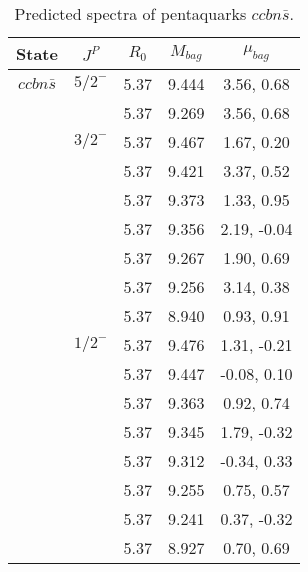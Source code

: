 \documentclass[prd,twocolumn,floatfix,nofootinbib]{revtex4}
\begin{document}
\renewcommand{\tabcolsep}{0.5cm}
\renewcommand{\arraystretch}{1.2}
\begin{table*}[!htbp]
    \caption{Predicted spectra of pentaquarks $ccbn\bar{s}$.}
    \begin{tabular}{ccccc}
        \hline\hline
        {\rm State} &$J^{P}$ &$R_{0}$ &$M_{bag}$ &$\mu_{bag}$ \\ \hline
        ${ccbn\bar{s}}$
            &${5/2}^{-}$    &5.37   &9.444  &3.56, 0.68 \\
            &               &5.37   &9.269  &3.56, 0.68 \\
            &${3/2}^{-}$    &5.37   &9.467  &1.67, 0.20 \\
            &               &5.37   &9.421  &3.37, 0.52 \\
            &               &5.37   &9.373  &1.33, 0.95 \\
            &               &5.37   &9.356  &2.19, -0.04 \\
            &               &5.37   &9.267  &1.90, 0.69 \\
            &               &5.37   &9.256  &3.14, 0.38 \\
            &               &5.37   &8.940  &0.93, 0.91 \\
            &${1/2}^{-}$    &5.37   &9.476  &1.31, -0.21 \\
            &               &5.37   &9.447  &-0.08, 0.10 \\
            &               &5.37   &9.363  &0.92, 0.74 \\
            &               &5.37   &9.345  &1.79, -0.32 \\
            &               &5.37   &9.312  &-0.34, 0.33 \\
            &               &5.37   &9.255  &0.75, 0.57 \\
            &               &5.37   &9.241  &0.37, -0.32 \\
            &               &5.37   &8.927  &0.70, 0.69 \\
        \hline\hline
    \end{tabular}
\end{table*}
\end{document}
